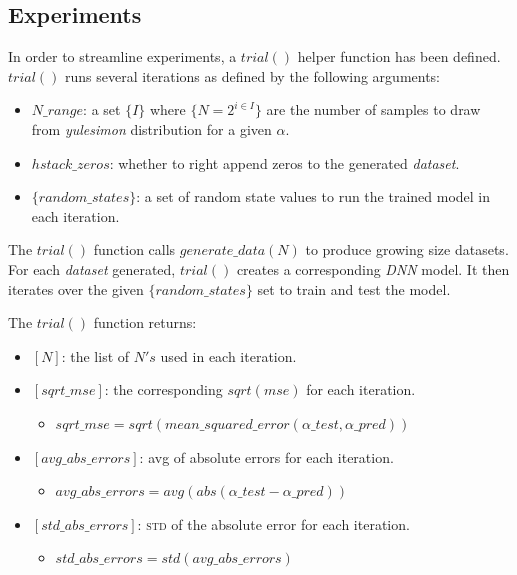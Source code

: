 \documentclass[a4paper, 12pt]{report}
\begin{document}
\subsection{Experiments}
In order to streamline experiments, a $trial()$ helper function has been defined.\\
$trial()$ runs several iterations as defined by the following arguments:

\begin{itemize}
  \item $N\_range$: a set $\{I\}$ where $\{N = 2^{i\in I}\}$ are the number of samples to draw from \textit{yulesimon} distribution for a given $\alpha$.
  \item $hstack\_zeros$: whether to right append zeros to the generated \textit{dataset}.
  \item $\{random\_states\}$: a set of random state values to run the trained model in each iteration.
\end{itemize}

The $trial()$ function calls $generate\_data(N)$ to produce growing size datasets. For each \textit{dataset} generated, $trial()$ creates a corresponding \textit{DNN} model. It then iterates over the given $\{random\_states\}$ set to train and test the model.

The $trial()$ function returns:
\begin{itemize}
\small
  \item $[N]$: the list of $N's$ used in each iteration.
  \item $[sqrt\_mse]$: the corresponding $sqrt(mse)$ for each iteration.
  \begin{itemize}
    \item $sqrt\_mse = sqrt(mean\_squared\_error(\alpha\_test, \alpha\_pred))$
  \end{itemize}
  \item $[avg\_abs\_errors]$: avg of absolute errors for each iteration.
  \begin{itemize}
    \item $avg\_abs\_errors = avg(abs(\alpha\_test - \alpha\_pred))$
  \end{itemize}
  \item $[std\_abs\_errors]$: \textsc{std} of the absolute error for each iteration.
  \begin{itemize}
    \item $std\_abs\_errors = std(avg\_abs\_errors)$
  \end{itemize}
\end{itemize}
\end{document}
